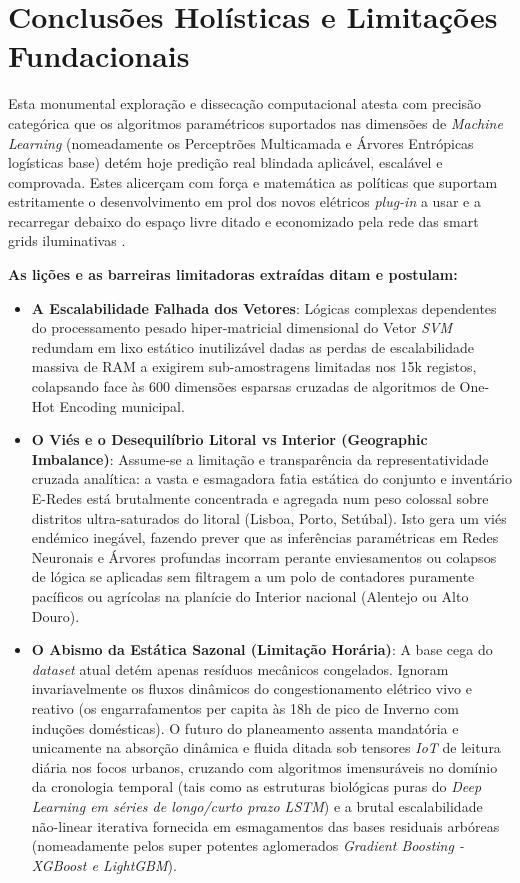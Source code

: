 \documentclass[conference]{IEEEtran}
\begin{document}
\section{Conclusões Holísticas e Limitações Fundacionais}
Esta monumental exploração e dissecação computacional atesta com precisão categórica que os algoritmos paramétricos suportados nas dimensões de \textit{Machine Learning} (nomeadamente os Perceptrões Multicamada e Árvores Entrópicas logísticas base) detém hoje predição real blindada aplicável, escalável e comprovada. Estes alicerçam com força e matemática as políticas que suportam estritamente o desenvolvimento em prol dos novos elétricos \textit{plug-in} a usar e a recarregar debaixo do espaço livre ditado e economizado pela rede das smart grids iluminativas \cite{b5}.

\textbf{As lições e as barreiras limitadoras extraídas ditam e postulam:}
\begin{itemize}
    \item \textbf{A Escalabilidade Falhada dos Vetores}: Lógicas complexas dependentes do processamento pesado hiper-matricial dimensional do Vetor \textit{SVM} redundam em lixo estático inutilizável dadas as perdas de escalabilidade massiva de RAM a exigirem sub-amostragens limitadas nos 15k registos, colapsando face às 600 dimensões esparsas cruzadas de algoritmos de One-Hot Encoding municipal.
    \item \textbf{O Viés e o Desequilíbrio Litoral vs Interior (Geographic Imbalance)}: Assume-se a limitação e transparência da representatividade cruzada analítica: a vasta e esmagadora fatia estática do conjunto e inventário E-Redes está brutalmente concentrada e agregada num peso colossal sobre distritos ultra-saturados do litoral (Lisboa, Porto, Setúbal). Isto gera um viés endémico inegável, fazendo prever que as inferências paramétricas em Redes Neuronais e Árvores profundas incorram perante enviesamentos ou colapsos de lógica se aplicadas sem filtragem a um polo de contadores puramente pacíficos ou agrícolas na planície do Interior nacional (Alentejo ou Alto Douro).
    \item \textbf{O Abismo da Estática Sazonal (Limitação Horária)}: A base cega do \textit{dataset} atual detém apenas resíduos mecânicos congelados. Ignoram invariavelmente os fluxos dinâmicos do congestionamento elétrico vivo e reativo (os engarrafamentos per capita às 18h de pico de Inverno com induções domésticas). O futuro do planeamento assenta mandatória e unicamente na absorção dinâmica e fluida ditada sob tensores \textit{IoT} de leitura diária nos focos urbanos, cruzando com algoritmos imensuráveis no domínio da cronologia temporal (tais como as estruturas biológicas puras do \textit{Deep Learning em séries de longo/curto prazo LSTM}) e a brutal escalabilidade não-linear iterativa fornecida em esmagamentos das bases residuais arbóreas (nomeadamente pelos super potentes aglomerados \textit{Gradient Boosting - XGBoost e LightGBM}).
\end{itemize}
\end{document}
